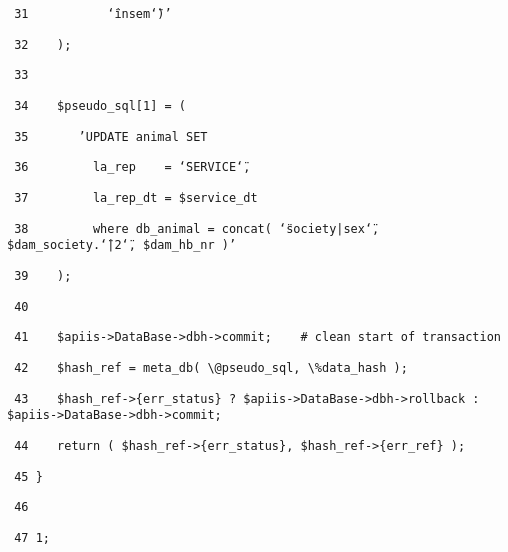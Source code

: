 \begin{table}[htbp]
\texttt{\small ~31~~~~~~~~~~ \char`\"{}insem\char`\"{})'}{\small \par}

\texttt{\small ~32~~~ );}{\small \par}

\texttt{\small ~33 }{\small \par}

\texttt{\small ~34~~~ \$pseudo\_sql{[}1{]} = (}{\small \par}

\texttt{\small ~35~~~~~~ 'UPDATE animal SET}{\small \par}

\texttt{\small ~36~~~~~~~~ la\_rep~~~ = \char`\"{}SERVICE\char`\"{},}{\small \par}

\texttt{\small ~37~~~~~~~~ la\_rep\_dt = \$service\_dt}{\small \par}

\texttt{\small ~38~~~~~~~~ where db\_animal = concat( \char`\"{}society|sex\char`\"{},
\$dam\_society.\char`\"{}|2\char`\"{}, \$dam\_hb\_nr )'}{\small \par}

\texttt{\small ~39~~~ );}{\small \par}

\texttt{\small ~40 }{\small \par}

\texttt{\small ~41~~~ \$apiis->DataBase->dbh->commit;~~~ \# clean start of transaction}{\small \par}

\texttt{\small ~42~~~ \$hash\_ref = meta\_db( \textbackslash{}@pseudo\_sql,
\textbackslash{}\%data\_hash );}{\small \par}

\texttt{\small ~43~~~ \$hash\_ref->\{err\_status\} ? \$apiis->DataBase->dbh->rollback
: \$apiis->DataBase->dbh->commit;}{\small \par}

\texttt{\small ~44~~~ return ( \$hash\_ref->\{err\_status\}, \$hash\_ref->\{err\_ref\}
);}{\small \par}

\texttt{\small ~45 \}}{\small \par}

\texttt{\small ~46 }{\small \par}

\texttt{\small ~47 1;}
\end{table}


